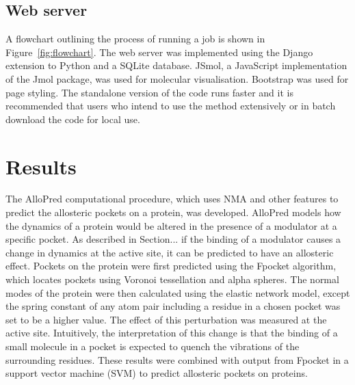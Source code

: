 \subsection{Web server}

A flowchart outlining the process of running a job is shown in Figure~\ref{fig:flowchart}.
The web server was implemented using the Django extension to Python and a SQLite database.
JSmol, a JavaScript implementation of the Jmol package, was used for molecular visualisation.
Bootstrap was used for page styling.
The standalone version of the code runs faster and it is recommended that users who intend to use the method extensively or in batch download the code for local use.


\section{Results}
\label{sec:allopred_results}

The AlloPred computational procedure, which uses NMA and other features to predict the allosteric pockets on a protein, was developed.
AlloPred models how the dynamics of a protein would be altered in the presence of a modulator at a specific pocket.
As described in Section... if the binding of a modulator causes a change in dynamics at the active site, it can be predicted to have an allosteric effect.
Pockets on the protein were first predicted using the Fpocket \cite{LeGuilloux2009} algorithm, which locates pockets using Voronoi tessellation and alpha spheres.
The normal modes of the protein were then calculated using the elastic network model, except the spring constant of any atom pair including a residue in a chosen pocket was set to be a higher value.
The effect of this perturbation was measured at the active site.
Intuitively, the interpretation of this change is that the binding of a small molecule in a pocket is expected to quench the vibrations of the surrounding residues.
These results were combined with output from Fpocket in a support vector machine (SVM) to predict allosteric pockets on proteins.

